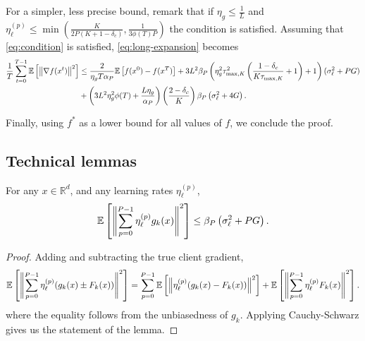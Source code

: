 For a simpler, less precise bound, remark that if $\eta_g \leq \tfrac{1}{L}$ and $\eta_{\ell}^{(p)} \leq \min \left( \tfrac{K}{2P(K+1-\delta_c)}, \tfrac{1}{3\phi(T)P} \right)$ the condition is satisfied.
Assuming that \eqref{eq:condition} is satisfied, \eqref{eq:long-expansion} becomes
\begin{equation}
    \begin{aligned}
        \frac{1}{T} \sum_{t=0}^{T-1} \mathbb{E}\left[\left\lVert\nabla f(x^t)\right\rVert^2\right] & \leq \frac{2}{\eta_g T \alpha_P}\mathbb{E}\left[f(x^{0}) - f(x^T)\right] + 3 L^2 \beta_P \left( \eta^2_g \tau_{\max,K}^2 \left (\frac{1-\delta_c}{K \tau_{\max, K}} + 1 \right) + 1\right)  (\sigma_{\ell}^2 + PG) \\
                                                                    & +  \left( 3L^2 \eta_g^2 \phi(T) + \frac{L \eta_g}{\alpha_P} \right) \left(\frac{2-\delta_c}{K}\right)\beta_P \left(\sigma_{\ell}^2 + 4G\right).
    \end{aligned}
\end{equation}

Finally, using $f^*$ as a lower bound for all values of $f$, we conclude the proof.

\subsection{Technical lemmas}
\begin{lemma} \label{lemma:stochastic-gradient-bound}
    For any $x\in \mathbb{R}^d$, and any learning rates $\eta_{\ell}^{(p)}$,
    \begin{equation}
        \mathbb{E}\left[\left\lVert\sum_{p=0}^{P-1} \eta_{\ell}^{(p)} g_k(x)\right\rVert^2\right] \leq \beta_P\left( \sigma_{\ell}^2 + PG\right).
    \end{equation}
\end{lemma}
\begin{proof}
    Adding and subtracting the true client gradient,
    \begin{equation}
        \mathbb{E}\left[\left\lVert\sum_{p=0}^{P-1} \eta_{\ell}^{(p)} (g_k(x) \pm F_k(x))\right\rVert^2\right] = \sum_{p=0}^{P-1} \mathbb{E}\left[\left\lVert\eta_{\ell}^{(p)}(g_k(x) - F_k(x))\right\rVert^2\right] + \mathbb{E}\left[\left\lVert\sum_{p=0}^{P-1} \eta_{\ell}^{(p)} F_k(x)\right\rVert^2\right].
    \end{equation}
    where the equality follows from the unbiasedness of $g_k$.
    Applying Cauchy-Schwarz gives us the statement of the lemma.
\end{proof}

